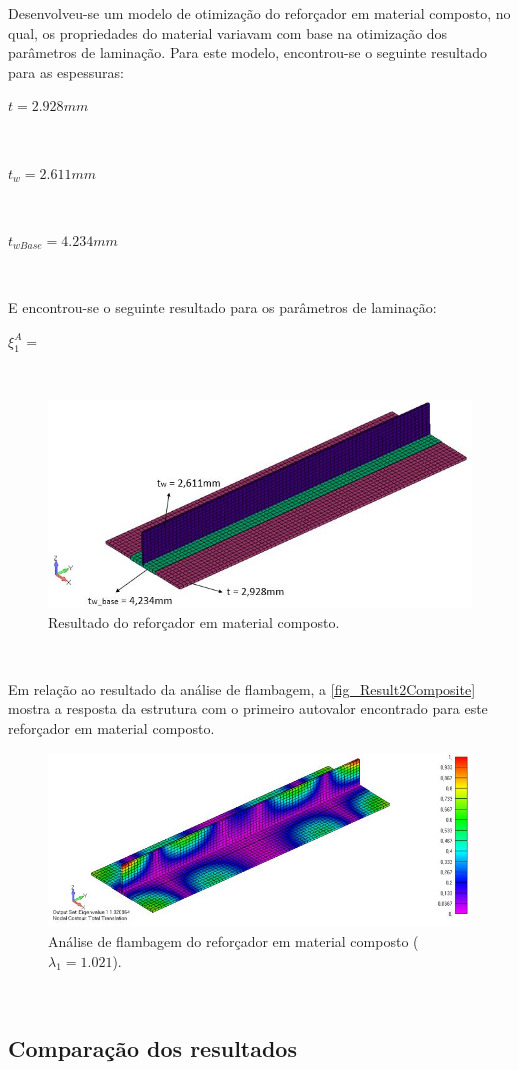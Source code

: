 Desenvolveu-se um modelo de otimização do reforçador em material composto, no qual, os propriedades do material variavam com base na otimização dos parâmetros de laminação. Para este modelo, encontrou-se o seguinte resultado para as espessuras:\

\centerline{$t = 2.928 mm$}\

\centerline{$t_w = 2.611 mm$}\

\centerline{$t_{wBase} = 4.234 mm$}\

E encontrou-se o seguinte resultado para os parâmetros de laminação:\

\centerline{$\xi^A_{1}= $}\



\begin{figure}[ht]
 \caption{\label{fig_Result1Composite}Resultado do reforçador em material composto.}
 \centering
 \includegraphics[scale=0.7]{figura/Results_Composite}
\end{figure}
\

Em relação ao resultado da análise de flambagem, a \autoref{fig_Result2Composite} mostra a resposta da estrutura com o primeiro autovalor encontrado para este reforçador em material composto.

\begin{figure}[ht]
 \caption{\label{fig_Result2Composite}Análise de flambagem do reforçador em material composto ($\lambda_1 = 1.021$).}
 \centering
 \includegraphics[scale=0.7]{figura/Results2_Composite}
\end{figure}
\

\subsection{Comparação dos resultados}
